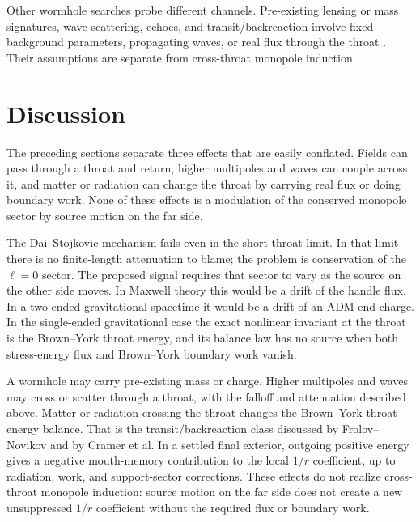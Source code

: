 \documentclass[aps,prd,10pt,onecolumn,nofootinbib,superscriptaddress,floatfix]{revtex4-2}
\begin{document}
Other wormhole searches probe different channels.  Pre-existing lensing or mass
signatures, wave scattering, echoes, and transit/backreaction involve fixed
background parameters, propagating waves, or real flux through the throat
\cite{BaoHouZhang2023GWScattering,CramerEtAl1995NaturalWormholes}.  Their
assumptions are separate from cross-throat monopole induction.

\section{Discussion}
\label{sec:discussion}

The preceding sections separate three effects that are easily conflated.
Fields can pass through a throat and return, higher multipoles and waves can
couple across it, and matter or radiation can change the throat by carrying
real flux or doing boundary work.  None of these effects is a modulation of
the conserved monopole sector by source motion on the far side.

The Dai--Stojkovic mechanism fails even in the short-throat limit.  In that
limit there is no finite-length attenuation to blame; the problem is
conservation of the $\ell=0$ sector.  The proposed signal requires that sector
to vary as the source on the other side moves.  In Maxwell theory this would be
a drift of the handle flux.  In a two-ended gravitational spacetime it would be
a drift of an ADM end charge.  In the single-ended gravitational case the exact
nonlinear invariant at the throat is the Brown--York throat energy, and its
balance law has no source when both stress-energy flux and Brown--York boundary
work vanish.

A wormhole may carry pre-existing mass or charge.  Higher multipoles and waves
may cross or scatter through a throat, with the falloff and attenuation
described above.  Matter or radiation crossing the throat changes the
Brown--York throat-energy balance.  That is the transit/backreaction class
discussed by Frolov--Novikov and by Cramer et al.  In a settled final exterior,
outgoing positive energy gives a negative mouth-memory contribution to the
local $1/r$ coefficient, up to radiation, work, and support-sector corrections.
These effects do not realize cross-throat monopole induction: source motion on
the far side does not create a new unsuppressed $1/r$ coefficient without the
required flux or boundary work.
\end{document}

